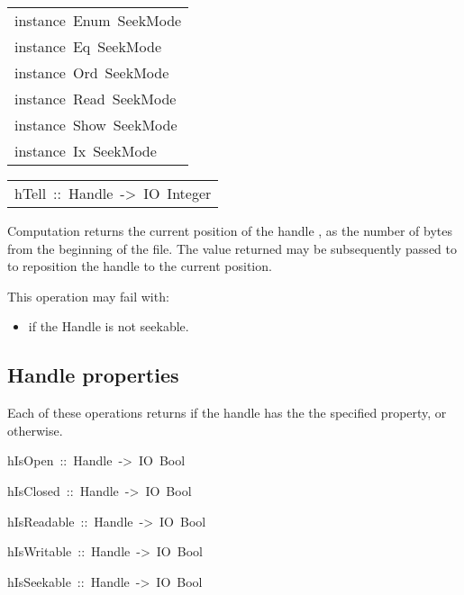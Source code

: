 \begin{haddockdesc}
\item[\begin{tabular}{@{}l}
instance\ Enum\ SeekMode\\instance\ Eq\ SeekMode\\instance\ Ord\ SeekMode\\instance\ Read\ SeekMode\\instance\ Show\ SeekMode\\instance\ Ix\ SeekMode
\end{tabular}]
\end{haddockdesc}
\begin{haddockdesc}
\item[\begin{tabular}{@{}l}
hTell\ ::\ Handle\ ->\ IO\ Integer
\end{tabular}]\haddockbegindoc
Computation   returns the current position of the
 handle , as the number of bytes from the beginning of
 the file.  The value returned may be subsequently passed to
  to reposition the handle to the current position.
\par
This operation may fail with:
\par
\begin{itemize}
\item
  if the Handle is not seekable.
\par

\end{itemize}

\end{haddockdesc}
\subsection{Handle properties
}
Each of these operations returns  if the handle has the
 the specified property, or  otherwise.
\par

\begin{haddockdesc}
\item[
hIsOpen\ ::\ Handle\ ->\ IO\ Bool
]
\item[
hIsClosed\ ::\ Handle\ ->\ IO\ Bool
]
\item[
hIsReadable\ ::\ Handle\ ->\ IO\ Bool
]
\item[
hIsWritable\ ::\ Handle\ ->\ IO\ Bool
]
\item[
hIsSeekable\ ::\ Handle\ ->\ IO\ Bool
]
\end{haddockdesc}
